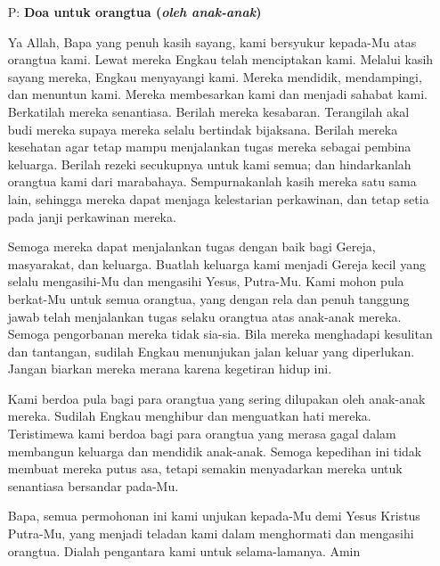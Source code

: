 \documentclass[a5paper,12pt,openany]{scrbook}
\newcommand{\BP}[1]{\begin{itemize} \item[P:] #1 \end{itemize}}
\begin{document}
\BP{\textbf{Doa untuk orangtua (\textit{oleh anak-anak})}

Ya Allah, Bapa yang penuh kasih sayang, kami bersyukur kepada-Mu atas orangtua kami. Lewat mereka Engkau telah menciptakan kami. Melalui kasih sayang mereka, Engkau menyayangi kami. Mereka mendidik, mendampingi, dan menuntun kami. Mereka membesarkan kami dan menjadi sahabat kami.
Berkatilah mereka senantiasa. Berilah mereka kesabaran. Terangilah akal budi mereka supaya mereka selalu bertindak bijaksana. Berilah mereka kesehatan agar tetap mampu menjalankan tugas mereka sebagai pembina keluarga. Berilah rezeki secukupnya untuk kami semua; dan hindarkanlah orangtua kami dari marabahaya. Sempurnakanlah kasih mereka satu sama lain, sehingga mereka dapat menjaga kelestarian perkawinan, dan tetap setia pada janji perkawinan mereka.

Semoga mereka dapat menjalankan tugas dengan baik bagi Gereja, masyarakat, dan keluarga. Buatlah keluarga kami menjadi Gereja kecil yang selalu mengasihi-Mu dan mengasihi Yesus, Putra-Mu.
Kami mohon pula berkat-Mu untuk semua orangtua, yang dengan rela dan penuh tanggung jawab telah menjalankan tugas selaku orangtua atas anak-anak mereka. Semoga pengorbanan mereka tidak sia-sia. Bila mereka menghadapi kesulitan dan tantangan, sudilah Engkau menunjukan jalan keluar yang diperlukan. Jangan biarkan mereka merana karena kegetiran hidup ini.

Kami berdoa pula bagi para orangtua yang sering dilupakan oleh anak-anak mereka. Sudilah Engkau menghibur dan menguatkan hati mereka. Teristimewa kami berdoa bagi para orangtua yang merasa gagal dalam membangun keluarga dan mendidik anak-anak. Semoga kepedihan ini tidak membuat mereka putus asa, tetapi semakin menyadarkan mereka untuk senantiasa bersandar pada-Mu.

Bapa, semua permohonan ini kami unjukan kepada-Mu demi Yesus Kristus Putra-Mu, yang menjadi teladan kami dalam menghormati dan mengasihi orangtua. Dialah pengantara kami untuk selama-lamanya. Amin
}
\normalsize
\end{document}
